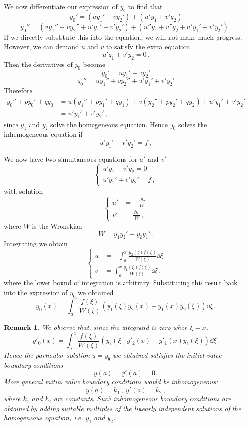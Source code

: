 \documentclass{article}
\theoremstyle{plain}\theoremheaderfont{\normalfont\itshape}\theorembodyfont{\rmfamily}\theoremseparator{.}\newtheorem*{rem}{Remark}\newtheorem*{ex}{Example}\newtheorem*{proof}{Proof}\newtheorem*{altp}{Alternative proof}
\theoremstyle{plain}\theoremheaderfont{\normalfont\bfseries}\theorembodyfont{\rmfamily}\theoremseparator{.}\newtheorem{thm}{Theorem}[section]\newtheorem{lem}[thm]{Lemma}\newtheorem{prop}[thm]{Proposition}\newtheorem*{cor}{Corollary}\newtheorem{defn}[thm]{Definition}\newtheorem{clm}[thm]{Claim}\newtheorem{clminproof}{Claim}
\theoremstyle{break}\theoremheaderfont{\normalfont\itshape}\theorembodyfont{\rmfamily}\theoremseparator{.\medskip}\newtheorem*{proofskip}{Proof}\newtheorem*{exs}{Examples}\newtheorem*{rems}{Remarks}
\theoremstyle{break}\theoremheaderfont{\normalfont\bfseries}\theorembodyfont{\rmfamily}\theoremseparator{.\medskip}\newtheorem{lemskip}[thm]{Lemma}\newtheorem{defnskip}[thm]{Definition}\newtheorem{propskip}[thm]{Proposition}\newtheorem{thmskip}[thm]{Theorem}
\numberwithin{equation}{section}
\begin{document}
	We now differentiate our expression of \(y_0\) to find that
	\[y_0'=(uy_1'+vy_2')+(u'y_1+v'y_2)\]
	\[y_0''=(uy_1''+vy_2''+u'y_1'+v'y_2')+(u''y_1+v''y_2+u'y_1'+v'y_2')\,.\]
	If we directly substitute this into the equation, we will not make much progress. However, we can demand \(u\) and \(v\) to satisfy the extra equation
	\[u'y_1+v'y_2=0\,.\]
	Then the derivatives of \(y_0\) become
	\[y_0'=uy_1'+vy_2'\]
	\[y_0''=uy_1''+vy_2''+u'y_1'+v'y_2'\]
	Therefore
	\begin{align*}
		y_0''+py_0'+qy_0&=u(y_1''+py_1'+qy_1)+v(y_2''+py_2'+qy_2)+u'y_1'+v'y_2'\\
		&=u'y_1'+v'y_2'\,,
	\end{align*}
	since \(y_1\) and \(y_2\) solve the homogeneous equation. Hence \(y_0\) solves the inhomogeneous equation if
	\[u'y_1'+v'y_2'=f\,,\]

	We now have two simultaneous equations for \(u'\) and \(v'\)
	\[\begin{cases}
		u'y_1+v'y_2=0\\
		u'y_1'+v'y_2'=f\,,
	\end{cases}\]
	with solution
	\[\left\{\begin{aligned}
		u'&=-\frac{fy_2}{W}\\
		v'&=\frac{fy_1}{W}\,,
	\end{aligned}\right.\]
	where \(W\) is the Wronskian
	\[W=y_1y_2'-y_2y_1'\,.\]
	Integrating we obtain
	\[\left\{\begin{aligned}
		u&=-\int_{a}^{x}\frac{y_2(\xi)f(\xi)}{W(\xi)}\dd{\xi}\\
		v&=\int_{a}^{x}\frac{y_1(\xi)f(\xi)}{W(\xi)}\dd{\xi}\,,
	\end{aligned}\right.\]
	where the lower bound of integration is arbitrary. Substituting this result back into the expression of \(y_0\) we obtained
	\[y_0(x)=\int_{a}^{x}\frac{f(\xi)}{W(\xi)}(y_1(\xi)y_2(x)-y_1(x)y_2(\xi))\dd{\xi}\,.\]
	\begin{rem}
		We observe that, since the integrand is zero when \(\xi=x\),
		\[y'_0(x)=\int_{a}^{x}\frac{f(\xi)}{W(\xi)}(y_1(\xi)y'_2(x)-y'_1(x)y_2(\xi))\dd{\xi}\,.\]
		Hence the particular solution \(y=y_0\) we obtained satisfies the initial value boundary conditions
		\[y(a)=y'(a)=0\,.\]
		More general initial value boundary conditions would be inhomogeneous:
		\[y(a)=k_1\,,\; y'(a)=k_2\,,\]
		where \(k_1\) and \(k_2\) are constants. Such inhomogeneous boundary conditions are obtained by adding suitable multiples of the linearly independent solutions of the homogeneous equation, i.e. \(y_1\) and \(y_2\).
	\end{rem}
	\newpage
\end{document}
